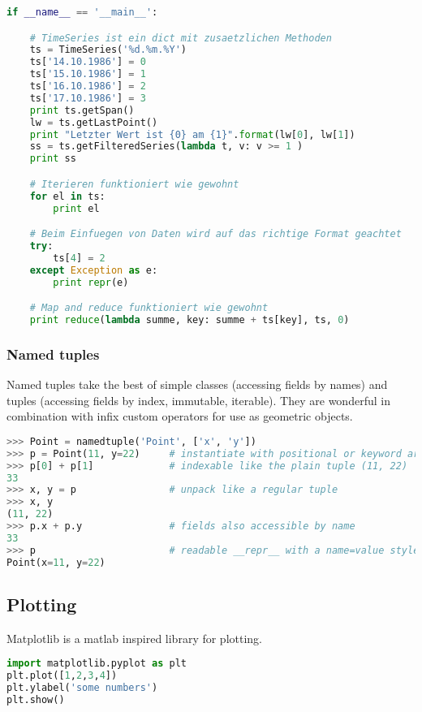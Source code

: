\begin{lstlisting}[language=python]
if __name__ == '__main__':

    # TimeSeries ist ein dict mit zusaetzlichen Methoden
    ts = TimeSeries('%d.%m.%Y')
    ts['14.10.1986'] = 0
    ts['15.10.1986'] = 1
    ts['16.10.1986'] = 2
    ts['17.10.1986'] = 3
    print ts.getSpan()
    lw = ts.getLastPoint()
    print "Letzter Wert ist {0} am {1}".format(lw[0], lw[1])
    ss = ts.getFilteredSeries(lambda t, v: v >= 1 )
    print ss

    # Iterieren funktioniert wie gewohnt
    for el in ts:
        print el

    # Beim Einfuegen von Daten wird auf das richtige Format geachtet
    try:
        ts[4] = 2
    except Exception as e:
        print repr(e)

    # Map and reduce funktioniert wie gewohnt
    print reduce(lambda summe, key: summe + ts[key], ts, 0)

\end{lstlisting}


\subsubsection{Named tuples}
Named tuples take the best of simple classes (accessing fields by names) and tuples (accessing fields by index, immutable, iterable). They are wonderful in combination with infix custom operators for use as geometric objects.

\begin{lstlisting}[language=python]
>>> Point = namedtuple('Point', ['x', 'y'])
>>> p = Point(11, y=22)     # instantiate with positional or keyword arguments
>>> p[0] + p[1]             # indexable like the plain tuple (11, 22)
33
>>> x, y = p                # unpack like a regular tuple
>>> x, y
(11, 22)
>>> p.x + p.y               # fields also accessible by name
33
>>> p                       # readable __repr__ with a name=value style
Point(x=11, y=22)
\end{lstlisting}


\subsection{Plotting}

Matplotlib is a matlab inspired library for plotting. 

\begin{lstlisting}[language=python]
import matplotlib.pyplot as plt
plt.plot([1,2,3,4])
plt.ylabel('some numbers')
plt.show()
\end{lstlisting}

